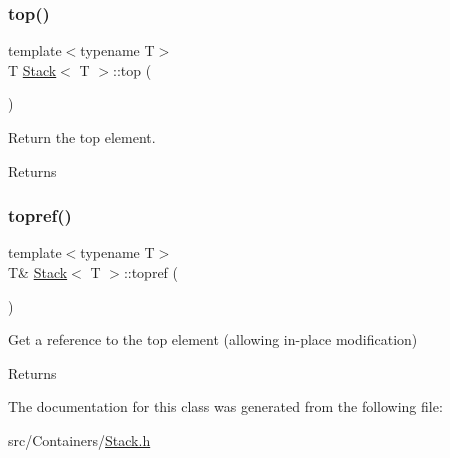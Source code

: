\subsubsection{\texorpdfstring{top()}{top()}}
{\footnotesize\ttfamily template$<$typename T$>$ \\
T \hyperlink{class_stack}{Stack}$<$ T $>$\+::top (\begin{DoxyParamCaption}{ }\end{DoxyParamCaption})\hspace{0.3cm}{\ttfamily [inline]}}

Return the top element. \begin{DoxyReturn}{Returns}

\end{DoxyReturn}
\mbox{\label{class_stack_a318da5613921ddf481a21c62ce006c3c}} 
\subsubsection{\texorpdfstring{topref()}{topref()}}
{\footnotesize\ttfamily template$<$typename T$>$ \\
T\& \hyperlink{class_stack}{Stack}$<$ T $>$\+::topref (\begin{DoxyParamCaption}{ }\end{DoxyParamCaption})\hspace{0.3cm}{\ttfamily [inline]}}

Get a reference to the top element (allowing in-\/place modification) \begin{DoxyReturn}{Returns}

\end{DoxyReturn}


The documentation for this class was generated from the following file\+:\begin{DoxyCompactItemize}
\item 
src/\+Containers/\hyperlink{_stack_8h}{Stack.\+h}\end{DoxyCompactItemize}
